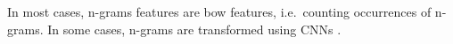 In most cases, n-grams features are \ac{bow} features, i.e.\ counting occurrences of n-grams.
In some cases, n-grams are transformed using CNNs \citep{tyo_state_2022}.